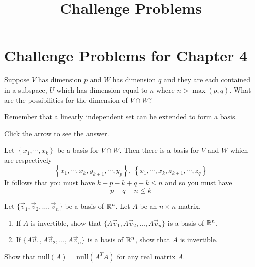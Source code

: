 \documentclass{ximera}
\title{Challenge Problems} \license{CC BY-NC-SA 4.0}
\begin{document}
\begin{abstract}
\end{abstract}
\maketitle

\section*{Challenge Problems for Chapter 4}

\begin{problem}\label{prb:5.29} Suppose $V$ has dimension $p$ and $W$ has dimension $q$ and they
are each contained in a subspace, $U$ which has dimension equal to $n$ where
$n>\max \left( p,q\right).$ What are the possibilities for the dimension of
$V\cap W$? 

\begin{hint}
Remember that a linearly independent set can be extended to form a basis.
\end{hint}

Click the arrow to see the answer.
\begin{expandable}
Let $\left\{ x_{1},\cdots ,x_{k}\right\} $ be a
basis for $V\cap W.$ Then there is a basis for $V$ and $W$ which are
respectively
\[
\left\{ x_{1},\cdots ,x_{k},y_{k+1},\cdots ,y_{p}\right\} ,\ \left\{
x_{1},\cdots ,x_{k},z_{k+1},\cdots ,z_{q}\right\}
\]
It follows that you must have $k+p-k+q-k\leq n$ and so you must have
\[
p+q-n\leq k
\]
\end{expandable}
\end{problem}

\begin{problem}\label{prob:nich6.2}
    Let $\{\vec{v}_1, \vec{v}_2, \dots, \vec{v}_n\}$ be a basis of $\mathbb{R}^n$.  Let $A$ be an $n\times n$ matrix.
    \begin{enumerate}
        \item If $A$ is invertible, show that $\{A\vec{v}_1, A\vec{v}_2, \dots, A\vec{v}_n\}$ is a basis of $\mathbb{R}^n$.
        \item If $\{A\vec{v}_1, A\vec{v}_2, \dots, A\vec{v}_n\}$ is a basis of $\mathbb{R}^n$, show that $A$ is invertible.
    \end{enumerate}
\end{problem}

\begin{problem}\label{prob:nich6.4}
    Show that $\text{null}(A)=\text{null}(A^TA)$ for any real matrix $A$. 
\end{problem}
\end{document}

